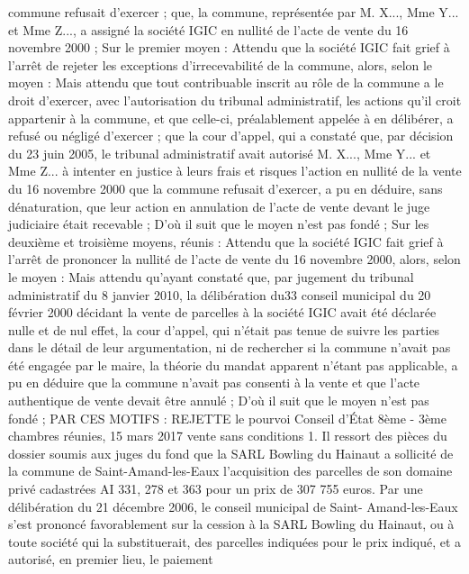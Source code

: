 \documentclass[11pt,a4paper]{report}
\begin{document}
	commune refusait d'exercer ; que, la commune, représentée par M. X..., Mme Y... et Mme Z..., a assigné la
	société IGIC en nullité de l'acte de vente du 16 novembre 2000 ;
	Sur le premier moyen :
	Attendu que la société IGIC fait grief à l'arrêt de rejeter les exceptions d'irrecevabilité de la commune, alors,
	selon le moyen :
	Mais attendu que tout contribuable inscrit au rôle de la commune a le droit d'exercer, avec l'autorisation du
	tribunal administratif, les actions qu'il croit appartenir à la commune, et que celle-ci, préalablement appelée à
	en délibérer, a refusé ou négligé d'exercer ; que la cour d'appel, qui a constaté que, par décision du 23 juin
	2005, le tribunal administratif avait autorisé M. X..., Mme Y... et Mme Z... à intenter en justice à leurs frais et
	risques l'action en nullité de la vente du 16 novembre 2000 que la commune refusait d'exercer, a pu en déduire,
	sans dénaturation, que leur action en annulation de l'acte de vente devant le juge judiciaire était recevable ;
	D'où il suit que le moyen n'est pas fondé ;
	Sur les deuxième et troisième moyens, réunis :
	Attendu que la société IGIC fait grief à l'arrêt de prononcer la nullité de l'acte de vente du 16 novembre 2000,
	alors, selon le moyen :
	Mais attendu qu'ayant constaté que, par jugement du tribunal administratif du 8 janvier 2010, la délibération du33
	conseil municipal du 20 février 2000 décidant la vente de parcelles à la société IGIC avait été déclarée nulle et
	de nul effet, la cour d'appel, qui n'était pas tenue de suivre les parties dans le détail de leur argumentation, ni de
	rechercher si la commune n'avait pas été engagée par le maire, la théorie du mandat apparent n'étant pas
	applicable, a pu en déduire que la commune n'avait pas consenti à la vente et que l'acte authentique de vente
	devait être annulé ;
	D'où il suit que le moyen n'est pas fondé ; PAR CES MOTIFS : REJETTE le pourvoi
	Conseil d'État 8ème - 3ème chambres réunies, 15 mars 2017  vente sans conditions
	1. Il ressort des pièces du dossier soumis aux juges du fond que la SARL Bowling du Hainaut a sollicité de la
	commune de Saint-Amand-les-Eaux l'acquisition des parcelles de son domaine privé cadastrées AI 331, 278 et
	363 pour un prix de 307 755 euros. Par une délibération du 21 décembre 2006, le conseil municipal de Saint-
	Amand-les-Eaux s'est prononcé favorablement sur la cession à la SARL Bowling du Hainaut, ou à toute société
	qui la substituerait, des parcelles indiquées pour le prix indiqué, et a autorisé, en premier lieu, le paiement
\end{document}
